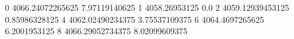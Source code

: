 0 4066.24072265625 7.97119140625
1 4058.26953125 0.0
2 4059.12939453125 0.85986328125
4 4062.02490234375 3.75537109375
6 4064.4697265625 6.2001953125
8 4066.29052734375 8.02099609375
